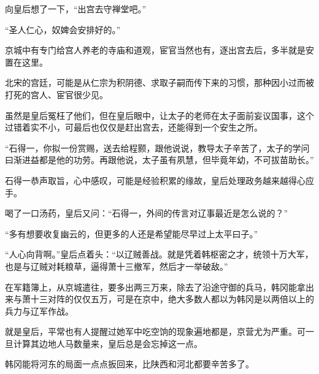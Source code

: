 向皇后想了一下，“出宫去守禅堂吧。”

“圣人仁心，奴婢会安排好的。”

京城中有专门给宫人养老的寺庙和道观，宦官当然也有，逐出宫去后，多半就是安置在这里。

北宋的宫廷，可能是从仁宗为积阴德、求取子嗣而传下来的习惯，那种因小过而被打死的宫人、宦官很少见。

虽然是皇后冤枉了他们，但在皇后眼中，让太子的老师在太子面前妄议国事，这个过错着实不小，可最后也仅仅是赶出宫去，还能得到一个安生之所。

“石得一，你拟一份赏赐，送去给程颢，跟他说说，教导太子辛苦了，太子的学问曰渐进益都是他的功劳。再跟他说，太子虽有夙慧，但毕竟年幼，不可拔苗助长。”

石得一恭声取旨，心中感叹，可能是经验积累的缘故，皇后处理政务越来越得心应手。

喝了一口汤药，皇后又问：“石得一，外间的传言对辽事最近是怎么说的？”

“多有想要收复幽云的，但更多的人还是希望能尽早过上太平曰子。”

“人心向背啊。”皇后点着头：“以辽贼善战。就是凭着韩枢密之才，统领十万大军，也是与辽贼对耗粮草，逼得萧十三撤军，然后才一举破敌。”

在军籍簿上，从京城遣往，要多出两三万来，除去了沿途守御的兵马，韩冈能拿出来与萧十三对阵的仅仅五万，可是在京中，绝大多数人都以为韩冈是以两倍以上的兵力与辽军作战。

就是皇后，平常也有人提醒过她军中吃空饷的现象遍地都是，京营尤为严重。可一旦计算其边地人马数量来，皇后总是会忘掉这一点。

韩冈能将河东的局面一点点扳回来，比陕西和河北都要辛苦多了。
